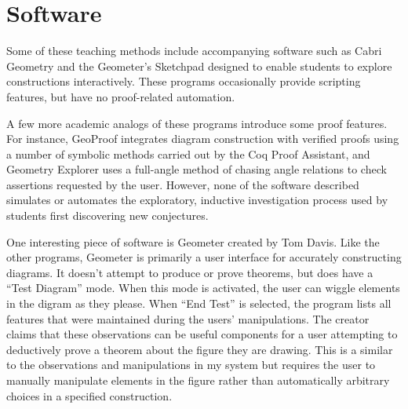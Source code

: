 \section{Software}
Some of these teaching methods include accompanying software such as
Cabri Geometry \cite{cabri} and the Geometer's Sketchpad
\cite{geoSketchpad} designed to enable students to explore
constructions interactively.  These programs occasionally provide
scripting features, but have no proof-related automation.

A few more academic analogs of these programs introduce some proof
features.  For instance, GeoProof \cite{geoProof} integrates diagram
construction with verified proofs using a number of symbolic methods
carried out by the Coq Proof Assistant, and Geometry Explorer
\cite{geoExplorer} uses a full-angle method of chasing angle relations
to check assertions requested by the user.  However, none of the
software described simulates or automates the exploratory, inductive
investigation process used by students first discovering new
conjectures.

One interesting piece of software is Geometer \cite{geometer} created
by Tom Davis. Like the other programs, Geometer is primarily a user
interface for accurately constructing diagrams. It doesn't attempt to
produce or prove theorems, but does have a ``Test Diagram'' mode. When
this mode is activated, the user can wiggle elements in the digram as
they please. When ``End Test'' is selected, the program lists all
features that were maintained during the users' manipulations. The
creator claims that these observations can be useful components for a
user attempting to deductively prove a theorem about the figure they
are drawing. This is a similar to the observations and manipulations
in my system but requires the user to manually manipulate elements in
the figure rather than automatically arbitrary choices in a specified
construction.
